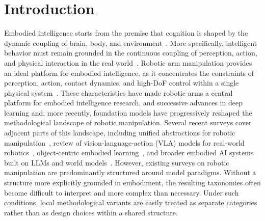 \documentclass[acmsmall,screen,review]{acmart}
\begin{document}



\maketitle

\section{Introduction}\label{sec:introduction}

Embodied intelligence starts from the premise that cognition is shaped by the dynamic coupling of brain, body, and environment~\cite{clarkBeingTherePutting1998}. 
More specifically, intelligent behavior must remain grounded in the continuous coupling of perception, action, and physical interaction in the real world~\cite{brooksIntelligenceWithoutRepresentation1991}.
Robotic arm manipulation provides an ideal platform for embodied intelligence, as it concentrates the constraints of perception, action, contact dynamics, and high-DoF control within a single physical system~\cite{khatibInertialPropertiesRobot1987}.
These characteristics have made robotic arms a central platform for embodied intelligence research, and successive advances in deep learning and, more recently, foundation models have progressively reshaped the methodological landscape of robotic manipulation.
Several recent surveys cover adjacent parts of this landscape, including unified abstractions for robotic manipulation~\cite{baiUnifiedUnderstandingRobot2025}, review of vision-language-action (VLA) models for real-world robotics~\cite{kawaharazukaVisionLanguageActionModelsRobotics2025}, object-centric embodied learning~\cite{survey2025objectcentric}, and broader embodied AI systems built on LLMs and world models~\cite{liuEmbodiedIntelligenceSynergy2025}. 
However, existing surveys on robotic manipulation are predominantly structured around model paradigms.
Without a structure more explicitly grounded in embodiment, the resulting taxonomies often become difficult to interpret and more complex than necessary.
Under such conditions, local methodological variants are easily treated as separate categories rather than as design choices within a shared structure.
\end{document}
